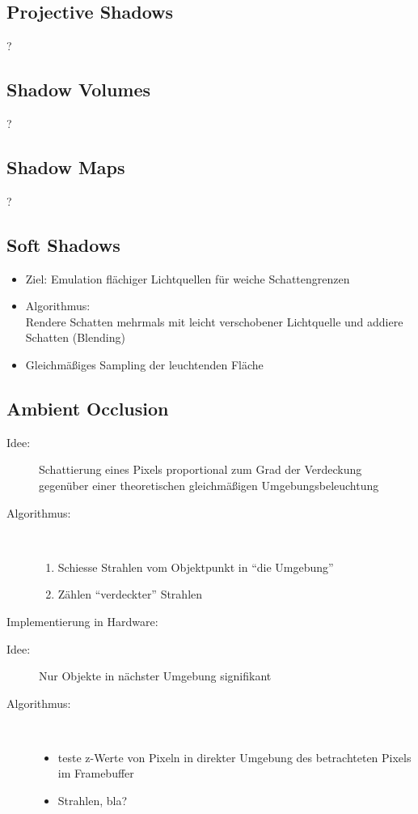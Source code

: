 \documentclass[a4paper, 12pt]{article}
\begin{document}
\subsection{Projective Shadows}
?


\subsection{Shadow Volumes}
?


\subsection{Shadow Maps}
?


\subsection{Soft Shadows}
\begin{itemize}
  \item Ziel: Emulation flächiger Lichtquellen für weiche Schattengrenzen
  \item Algorithmus:\\
    Rendere Schatten mehrmals mit leicht verschobener Lichtquelle und addiere Schatten (Blending)
  \item Gleichmäßiges Sampling der leuchtenden Fläche
\end{itemize}


\subsection{Ambient Occlusion}
\begin{description}
  \item[Idee:] Schattierung eines Pixels proportional zum Grad der Verdeckung gegenüber einer theoretischen gleichmäßigen Umgebungsbeleuchtung
  \item[Algorithmus:]~
    \begin{enumerate}
      \item Schiesse Strahlen vom Objektpunkt in ``die Umgebung''
      \item Zählen ``verdeckter'' Strahlen
    \end{enumerate}
\end{description}
Implementierung in Hardware:
\begin{description}
  \item[Idee:] Nur Objekte in nächster Umgebung signifikant
  \item[Algorithmus:]~
    \begin{itemize}
      \item teste z-Werte von Pixeln in direkter Umgebung des betrachteten Pixels im Framebuffer
      \item Strahlen, bla?
    \end{itemize}
\end{description}
\end{document}
